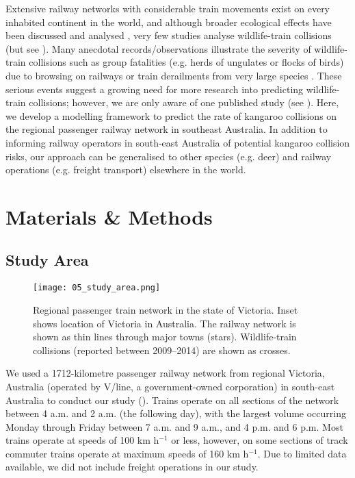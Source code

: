 Extensive railway networks with considerable train movements exist on every inhabited continent in the world, and although broader ecological effects have been discussed \citep{desa93,givo06} and analysed \citep{wall05}, very few studies analyse wildlife-train collisions (but see \cite{bela95,onoy98}). Many anecdotal records/observations illustrate the severity of wildlife-train collisions such as group fatalities (e.g. herds of ungulates or flocks of birds) due to browsing on railways or train derailments from very large species \citep{dors15}. These serious events suggest a growing need for more research into predicting wildlife-train collisions; however, we are only aware of one published study (see \cite{gund98}). Here, we develop a modelling framework to predict the rate of kangaroo collisions on the regional passenger railway network in southeast Australia. In addition to informing railway operators in south-east Australia of potential kangaroo collision risks, our approach can be generalised to other species (e.g. deer) and railway operations (e.g. freight transport) elsewhere in the world.

\section{Materials \& Methods}

\subsection{Study Area}

\begin{figure*}[htp]
  \centering
  \texttt{[image: 05\_study\_area.png]}
  \caption[Regional passenger train network in Victoria]{Regional passenger train network in the state of Victoria. Inset shows location of Victoria in Australia. The railway network is shown as thin lines through major towns (stars). Wildlife-train collisions (reported between 2009--2014) are shown as crosses.}
  \label{trains_study_area}
\end{figure*}

We used a 1712-kilometre passenger railway network from regional Victoria, Australia (operated by V/line, a government-owned corporation) in south-east Australia to conduct our study ().  Trains operate on all sections of the network between 4 a.m. and 2 a.m. (the following day), with the largest volume occurring Monday through Friday between 7 a.m. and 9 a.m., and 4 p.m. and 6 p.m. Most trains operate at speeds of 100 km h$^{-1}$ or less, however, on some sections of track commuter trains operate at maximum speeds of 160 km h$^{-1}$. Due to limited data available, we did not include freight operations in our study.

